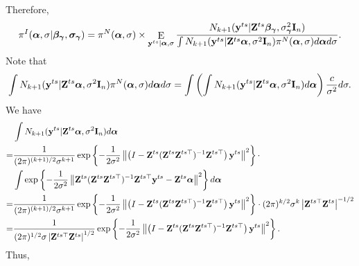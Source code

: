 \documentclass[11pt]{article}
\DeclareMathOperator{\myE}{E}
\newcommand{\By}{\mathbf{y}}    \newcommand{\Bz}{\mathbf{z}}
\newcommand{\bfsym}[1]{\ensuremath{\boldsymbol{#1}}}
\def\balpha{\bfsym \alpha}
\def\bbeta{\bfsym \beta}
\def\bgamma{\bfsym \gamma}             \def\bGamma{\bfsym \Gamma}
\def\bsigma{\bfsym \sigma}             \def\bSigma{\bfsym \Sigma}
\theoremstyle{plain}
\theoremstyle{definition}
\theoremstyle{remark}
\begin{document}
Therefore, 
\begin{equation*}
    \pi^I (\balpha, \sigma | \bbeta_{\bgamma}, \bsigma_{\bgamma}) 
    =
    \pi^N (\balpha, \sigma ) 
    \times
    \myE_{\By^{ts}|\balpha, \sigma}
    \frac{N_{k+1} (\By^{ts} | \BZ^{ts} \bbeta_{\bgamma}, \sigma^2_{\bgamma} \BI_n)}{\int N_{k+1} (\By^{ts} | \BZ^{ts} \balpha, \sigma^2 \BI_n) \pi^N (\balpha, \sigma) d\balpha d \sigma}.
\end{equation*}
Note that
\begin{equation*}
    \int N_{k+1} (\By^{ts} | \BZ^{ts} \balpha, \sigma^2 \BI_n) \pi^N (\balpha, \sigma) d\balpha d \sigma
    =
    \int\left(\int N_{k+1} (\By^{ts} | \BZ^{ts} \balpha, \sigma^2 \BI_n)  d\balpha   \right) \frac{c}{\sigma^2} d \sigma.
\end{equation*}
We have
\begin{equation*}
    \begin{split}
    &\int N_{k+1} (\By^{ts} | \BZ^{ts} \balpha, \sigma^2 \BI_n)  d\balpha   
    \\
    =
    &
    \frac{1}{(2\pi)^{(k+1)/2} \sigma^{k+1}} \exp\left\{-\frac{1}{2\sigma^2} \left\|\left(I-\BZ^{ts} (\BZ^{ts} \BZ^{ts\top})^{-1}\BZ^{ts\top}\right)\By^{ts}\right\|^2\right\}
    \cdot
    \\
    &\int 
    \exp\left\{-\frac{1}{2\sigma^2} \left\|\BZ^{ts} (\BZ^{ts} \BZ^{ts\top})^{-1}\BZ^{ts\top}\By^{ts}-\BZ^{ts}\balpha\right\|^2\right\}
    d\balpha   
    \\
    =
    &
    \frac{1}{(2\pi)^{(k+1)/2} \sigma^{k+1}} \exp\left\{-\frac{1}{2\sigma^2} \left\|\left(I-\BZ^{ts} (\BZ^{ts} \BZ^{ts\top})^{-1}\BZ^{ts\top}\right)\By^{ts}\right\|^2\right\}
    \cdot
    (2\pi)^{k/2} \sigma^k \left| \BZ^{ts\top} \BZ^{ts} \right|^{-1/2}
    \\
    =
    &
    \frac{1}{(2\pi)^{1/2} \sigma \left| \BZ^{ts\top} \BZ^{ts} \right|^{1/2} } \exp\left\{-\frac{1}{2\sigma^2} \left\|\left(I-\BZ^{ts} (\BZ^{ts} \BZ^{ts\top})^{-1}\BZ^{ts\top}\right)\By^{ts}\right\|^2\right\}
    .
    \end{split}
\end{equation*}
Thus,
\end{document}
